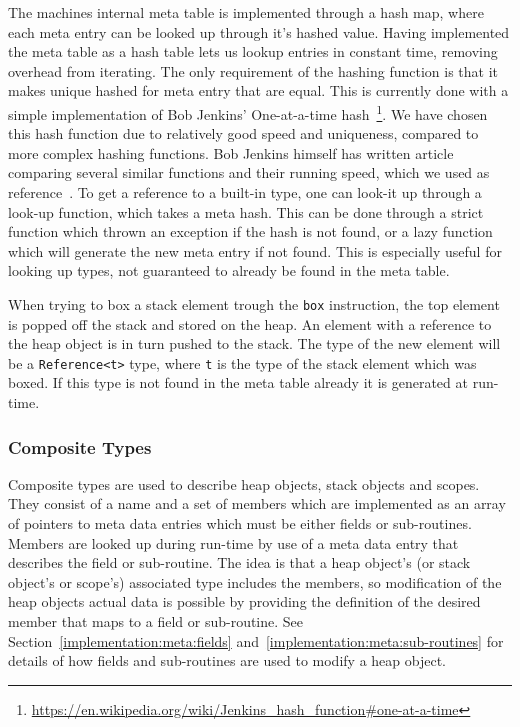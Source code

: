 The machines internal meta table is implemented through a hash map, where each
meta entry can be looked up through it's hashed value. Having implemented the
meta table as a hash table lets us lookup entries in constant time, removing
overhead from iterating. The only requirement of the hashing function is that it
makes unique hashed for meta entry that are equal. This is currently done with a
simple implementation of Bob Jenkins' One-at-a-time
hash~\footnote{\url{https://en.wikipedia.org/wiki/Jenkins_hash_function\#one-at-a-time}}. We
have chosen this hash function due to relatively good speed and uniqueness,
compared to more complex hashing functions. Bob Jenkins himself has written
article comparing several similar functions and their running speed, which we
used as reference~\cite{jenkins}. To get a reference to a built-in type, one can
look-it up through a look-up function, which takes a meta hash. This can be done
through a strict function which thrown an exception if the hash is not found, or
a lazy function which will generate the new meta entry if not found. This is
especially useful for looking up types, not guaranteed to already be found in
the meta table.

When trying to box a stack element trough the {\tt box} instruction, the top
element is popped off the stack and stored on the heap. An element with a
reference to the heap object is in turn pushed to the stack. The type of the new
element will be a {\tt Reference<t>} type, where {\tt t} is the type of the
stack element which was boxed. If this type is not found in the meta table
already it is generated at run-time.




\subsubsection{Composite Types}

Composite types are used to describe heap objects, stack objects and
scopes. They consist of a name and a set of members which are implemented as an
array of pointers to meta data entries which must be either fields or
sub-routines. Members are looked up during run-time by use of a meta data entry
that describes the field or sub-routine. The idea is that a heap object's (or
stack object's or scope's) associated type includes the members, so modification
of the heap objects actual data is possible by providing the definition of the
desired member that maps to a field or sub-routine. See
Section~\ref{implementation:meta:fields}
and~\ref{implementation:meta:sub-routines} for details of how fields and
sub-routines are used to modify a heap object.

